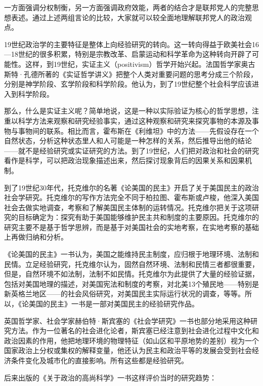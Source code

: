一方面强调分权制衡，另一方面强调政府效能，两者的结合才是联邦党人的完整思想表述。通过上述两组言论的比较，大家就可以较全面地理解联邦党人的政治观点。


19世纪政治学的主要特征是整体上向经验研究的转向。这一转向得益于欧美社会16—18世纪的很多积累，特别是宗教改革、启蒙运动和科学革命为这种转向开辟了可能性。这样，到19世纪，实证主义（positivism）哲学开始兴起。法国哲学家奥古斯特·孔德所著的《实证哲学讲义》把整个人类对重要问题的思考分成三个阶段，分别是神学阶段、玄学阶段和科学阶段。他认为，到了19世纪整个社会科学应该进入到科学阶段。

那么，什么是实证主义呢？简单地说，这是一种以实际验证为核心的哲学思想，注重以科学方法来观察和研究经验事实，通过这种观察和研究来探究事物的本源及事物与事物间的联系。相比而言，霍布斯在《利维坦》中的方法——先假设存在一个自然状态，分析这种状态里人和人可能是一种怎样的关系，然后推导出他的结论——就不是经验研究或实证研究的方法。到了19世纪，人们把对政治和社会的研究看作是科学，可以把政治现象描述出来，然后探讨现象背后的因果关系和因果机制。

到了19世纪30年代，托克维尔的名著《论美国的民主》开启了关于美国民主的政治社会学研究。托克维尔的写作方法完全不同于柏拉图、霍布斯或卢梭，他深入美国社会去做实地调查，考察和了解美国民主体制的运转情况。托克维尔把关于这项研究的目标确定为：探究有助于美国能够维护民主共和制度的主要原因。托克维尔的研究主要不是基于哲学思辨，而是基于对美国社会的实地考察，在实地考察的基础上再做归纳和分析。

《论美国的民主》一书认为，美国之能维持民主制度，应归根于地理环境、法制和民情。立足经验研究，托克维尔认为，固然自然环境、法制和民情三者都很重要，但是，自然环境不如法制，法制不如民情。托克维尔为此提供了大量的经验证据，包括对美国地理的描述，对美国宪法和制度的考察，对北美13个殖民地——特别是新英格兰地区——的社会风俗研究，对美国民主实际运行状况的调查，等等。所以，《论美国的民主》一书是一部对美国民主的经验研究作品。

英国哲学家、社会学家赫伯特·斯宾塞的《社会学研究》一书也部分地采用这种研究方法。作为一位著名的社会进化论者，斯宾塞已经注意到社会进化过程中文化和政治因素的作用，他把地理环境的物理特征（如山区和平原地势的差别）视为一个国家政治上分权或集权的解释变量，他还认为民主和政治平等的发展会受到社会经济条件变化及城市化的直接影响。所有这些都是经验研究。

后来出版的《关于政治的高尚科学》一书这样评价当时的研究趋势：

